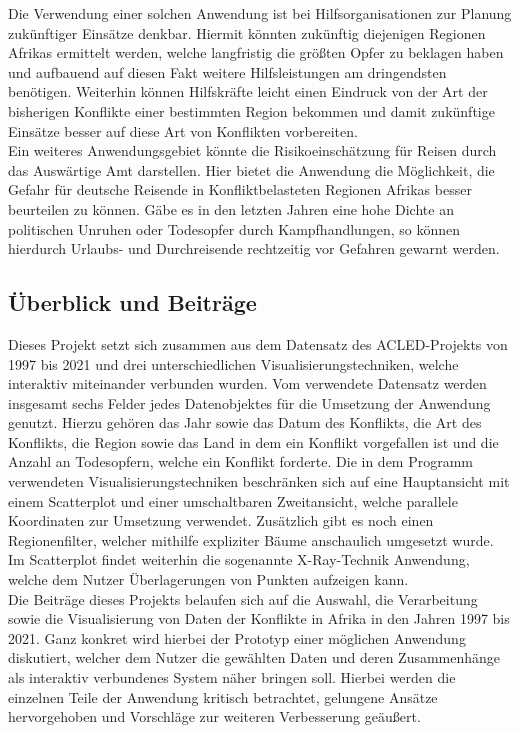 \documentclass[usegeometry=true]{scrartcl}
\begin{document}
Die Verwendung einer solchen Anwendung ist bei Hilfsorganisationen zur Planung zukünftiger Einsätze denkbar. Hiermit könnten zukünftig diejenigen Regionen Afrikas ermittelt werden, welche langfristig die größten Opfer zu beklagen haben und aufbauend auf diesen Fakt weitere Hilfsleistungen am dringendsten benötigen. Weiterhin können Hilfskräfte leicht einen Eindruck von der Art der bisherigen Konflikte einer bestimmten Region bekommen und damit zukünftige Einsätze besser auf diese Art von Konflikten vorbereiten.\\

Ein weiteres Anwendungsgebiet könnte die Risikoeinschätzung für Reisen durch das Auswärtige Amt \cite{aa} darstellen. Hier bietet die Anwendung die Möglichkeit, die Gefahr für deutsche Reisende in Konfliktbelasteten Regionen Afrikas besser beurteilen zu können. Gäbe es in den letzten Jahren eine hohe Dichte an politischen Unruhen oder Todesopfer durch Kampfhandlungen, so können hierdurch Urlaubs- und Durchreisende rechtzeitig vor Gefahren gewarnt werden.

\subsection{Überblick und Beiträge}
Dieses Projekt setzt sich zusammen aus dem Datensatz des ACLED-Projekts von 1997 bis 2021 und drei unterschiedlichen Visualisierungstechniken, welche interaktiv miteinander verbunden wurden. Vom verwendete Datensatz werden insgesamt sechs Felder jedes Datenobjektes für die Umsetzung der Anwendung genutzt. Hierzu gehören das Jahr sowie das Datum des Konflikts, die Art des Konflikts, die Region sowie das Land in dem ein Konflikt vorgefallen ist und die Anzahl an Todesopfern, welche ein Konflikt forderte. Die in dem Programm verwendeten Visualisierungstechniken beschränken sich auf eine Hauptansicht mit einem Scatterplot und einer umschaltbaren Zweitansicht, welche parallele Koordinaten zur Umsetzung verwendet. Zusätzlich gibt es noch einen Regionenfilter, welcher mithilfe expliziter Bäume anschaulich umgesetzt wurde. Im Scatterplot findet weiterhin die sogenannte X-Ray-Technik Anwendung, welche dem Nutzer Überlagerungen von Punkten aufzeigen kann. \\

Die Beiträge dieses Projekts belaufen sich auf die Auswahl, die Verarbeitung sowie die Visualisierung von Daten der Konflikte in Afrika in den Jahren 1997 bis 2021. Ganz konkret wird hierbei der Prototyp einer möglichen Anwendung diskutiert, welcher dem Nutzer die gewählten Daten und deren Zusammenhänge als interaktiv verbundenes System näher bringen soll. Hierbei werden die einzelnen Teile der Anwendung kritisch betrachtet, gelungene Ansätze hervorgehoben und Vorschläge zur weiteren Verbesserung geäußert.
\end{document}
